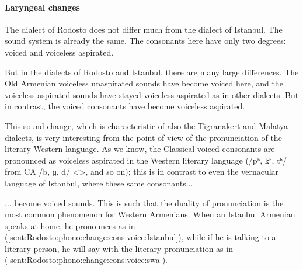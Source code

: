 \paragraph{Laryngeal changes}\label{section:Rodosto:Phono:SoundChange:Laryngeal}
The dialect of Rodosto does not differ much from the dialect of Istanbul. The sound system is already the same. The consonants here have only two degrees: voiced and voiceless aspirated. 

But in the dialects of Rodosto and Istanbul, there are many large differences. The Old Armenian voiceless unaspirated sounds have become voiced here, and the voiceless aspirated sounds have stayed voiceless aspirated as in other dialects. But in contrast, the voiced consonants have become voiceless aspirated. 


This sound change, which is characteristic of also the Tigranakert and Malatya dialects, is very interesting from the point of view of the pronunciation of the literary Western language. As we know, the Classical voiced consonants are pronounced as voiceless aspirated in the Western literary language (/pʰ, kʰ, tʰ/ from CA /b, ɡ, d/ <>, and so on); this is in contrast to even the vernacular language of Istanbul, where these same consonants... 



\begin{adjarianpage}\label{page:259}\end{adjarianpage}%

... become voiced sounds. This is such that the duality of pronunciation is the most common phenomenon for Western Armenians. When an Istanbul Armenian speaks at home, he pronounces as in (\ref{sent:Rodosto:phono:change:cons:voice:Istanbul}), while if he is talking to a literary person, he will say with the literary pronunciation as in (\ref{sent:Rodosto:phono:change:cons:voice:swa}).

